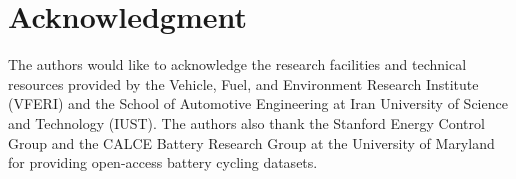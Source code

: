 \section*{Acknowledgment}
The authors would like to acknowledge the research facilities and technical resources provided by the Vehicle, Fuel, and Environment Research Institute (VFERI) and the School of Automotive Engineering at Iran University of Science and Technology (IUST). The authors also thank the Stanford Energy Control Group and the CALCE Battery Research Group at the University of Maryland for providing open-access battery cycling datasets.



